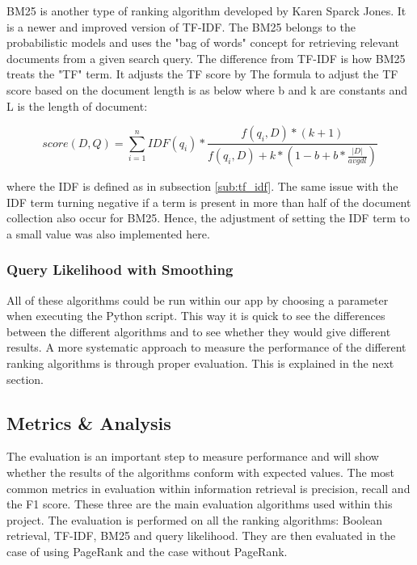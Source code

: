 BM25 is another type of ranking algorithm developed by Karen Sparck Jones. It is a newer and improved version of TF-IDF. The BM25 belongs to the probabilistic models and uses the "bag of words" concept for retrieving relevant documents from a given search query. The difference from TF-IDF is how BM25 treats the "TF" term. It adjusts the TF score by The formula to adjust the TF score based on the document length is as below where b and k are constants and L is the length of document:

$$ score(D, Q) = \sum_{i=1}^n IDF(q_i) * \frac{f(q_i, D)* (k + 1)}{f(q_i, D) + k * (1-b + b * \frac{|D|}{avgdl})}$$

where the IDF is defined as in subsection \ref{sub:tf_idf}. The same issue with the IDF term turning negative if a term is present in more than half of the document collection also occur for BM25. Hence, the adjustment of setting the IDF term to a small value was also implemented here.


\subsubsection{Query Likelihood with Smoothing} %
\label{ssub:query_likelihood_with_smoothing}


All of these algorithms could be run within our app by choosing a parameter when executing the Python script. This way it is quick to see the differences between the different algorithms and to see whether they would give different results. A more systematic approach to measure the performance of the different ranking algorithms is through proper evaluation. This is explained in the next section.



\subsection{Metrics \& Analysis} %
\label{sub:metrics_&_analysis}

The evaluation is an important step to measure performance and will show whether the results of the algorithms conform with expected values. The most common metrics in evaluation within information retrieval is precision, recall and the F1 score. These three are the main evaluation algorithms used within this project. The evaluation is performed on all the ranking algorithms: Boolean retrieval, TF-IDF, BM25 and query likelihood. They are then evaluated in the case of using PageRank and the case without PageRank.

